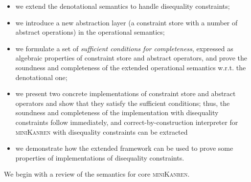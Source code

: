 \begin{itemize}
\item we extend the denotational semantics to handle disequality constraints;
\item we introduce a new abstraction layer (a constraint store with a number of abstract operations) in the operational semantics;
\item we formulate a set of \emph{sufficient conditions for completeness}, expressed as algebraic properties of constraint store and
  abstract operators, and prove the soundness and completeness of the extended operational semantics w.r.t. the denotational one;
\item we present two concrete implementations of constraint store and abstract operators and show that they satisfy the
  sufficient conditions; thus, the soundness and completeness of the implementation with disequality constraints follow
  immediately, and correct-by-construction interpreter for \textsc{miniKanren} with disequality constraints
  can be extracted
\item we demonstrate how the extended framework can be used to prove some properties of implementations of disequality constraints.
\end{itemize}

We begin with a review of the semantics for core \textsc{miniKanren}.